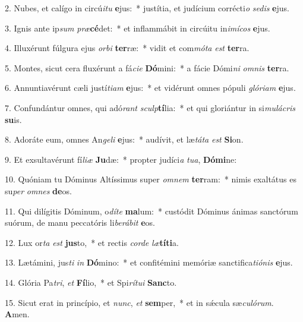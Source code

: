 2. Nubes, et calígo in circú\textit{i}\textit{tu} \textbf{e}jus:~*  justítia, et judícium corrécti\textit{o} \textit{se}\textit{dis} \textbf{e}jus.\

3. Ignis ante ip\textit{sum} \textit{præ}\textbf{cé}det:~*  et inflammábit in circúitu in\textit{i}\textit{mí}\textit{cos} \textbf{e}jus.\

4. Illuxérunt fúlgura ejus \textit{or}\textit{bi} \textbf{ter}ræ:~*  vidit et com\textit{mó}\textit{ta} \textit{est} \textbf{ter}ra.\

5. Montes, sicut cera fluxérunt a fá\textit{ci}\textit{e} \textbf{Dó}mini:~*  a fácie Dómi\textit{ni} \textit{om}\textit{nis} \textbf{ter}ra.\

6. Annuntiavérunt cæli justí\textit{ti}\textit{am} \textbf{e}jus:~*  et vidérunt omnes pópuli \textit{gló}\textit{ri}\textit{am} \textbf{e}jus.\

7. Confundántur omnes, qui adó\textit{rant} \textit{sculp}\textbf{tí}lia:~*  et qui gloriántur in si\textit{mu}\textit{lá}\textit{cris} \textbf{su}is.\

8. Adoráte eum, omnes An\textit{ge}\textit{li} \textbf{e}jus:~*  audívit, et læ\textit{tá}\textit{ta} \textit{est} \textbf{Si}on.\

9. Et exsultavérunt fí\textit{li}\textit{æ} \textbf{Ju}dæ:~*  propter judíci\textit{a} \textit{tu}\textit{a}, \textbf{Dó}\textbf{mi}ne:\

10. Quóniam tu Dóminus Altíssimus super \textit{om}\textit{nem} \textbf{ter}ram:~*  nimis exaltátus es su\textit{per} \textit{om}\textit{nes} \textbf{de}os.\

11. Qui dilígitis Dóminum, o\textit{dí}\textit{te} \textbf{ma}lum:~*  custódit Dóminus ánimas sanctórum suórum, de manu peccatóris li\textit{be}\textit{rá}\textit{bit} \textbf{e}os.\

12. Lux or\textit{ta} \textit{est} \textbf{jus}to,~*  et rectis \textit{cor}\textit{de} \textit{læ}\textbf{tí}\textbf{ti}a.\

13. Lætámini, jus\textit{ti} \textit{in} \textbf{Dó}mino:~*  et confitémini memóriæ sanctifica\textit{ti}\textit{ó}\textit{nis} \textbf{e}jus.\

14. Glória Pa\textit{tri}, \textit{et} \textbf{Fí}lio,~*  et Spi\textit{rí}\textit{tu}\textit{i} \textbf{Sanc}to.\

15. Sicut erat in princípio, et \textit{nunc}, \textit{et} \textbf{sem}per,~*  et in sǽcula sæ\textit{cu}\textit{ló}\textit{rum}. \textbf{A}men.\

